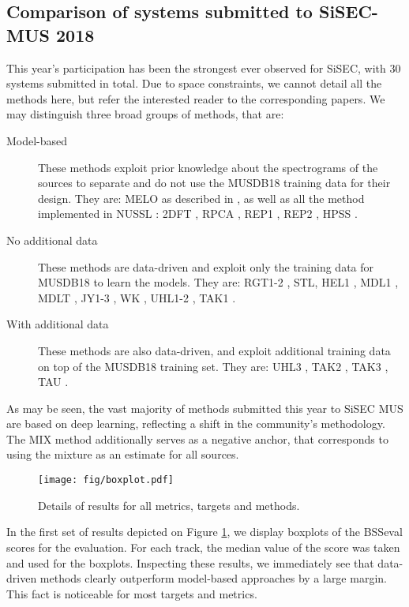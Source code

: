 \documentclass{llncs}
\begin{document}
\subsection{Comparison of systems submitted to SiSEC-MUS 2018}
This year's participation has been the strongest ever observed for SiSEC, with $30$ systems submitted in total. Due to space constraints, we cannot detail all the methods here, but refer the interested reader to the corresponding papers. We may distinguish three broad groups of methods, that are:
\begin{description}
  \item[Model-based] These methods exploit prior knowledge about the spectrograms of the sources to separate and do not use the MUSDB18 training data for their design. They are: MELO as described in \cite{MELO}, as well as all the method implemented in NUSSL \cite{NUSSL}: 2DFT \cite{2DFT}, RPCA \cite{RPCA}, REP1 \cite{REP1}, REP2 \cite{REP2}, HPSS \cite{HPSS}.
  \item[No additional data] These methods are data-driven and exploit only the
  training data for MUSDB18 to learn the models. They are: RGT1-2 \cite{RGT1}, STL, HEL1 \cite{HEL1}, MDL1 \cite{MDL1}, MDLT \cite{MDLT}, JY1-3 \cite{JY1}, WK \cite{WK}, UHL1-2 \cite{UHL}, TAK1 \cite{TAK12}.
  \item[With additional data] These methods are also data-driven, and exploit additional training data on top of the MUSDB18 training set. They are: UHL3 \cite{UHL}, TAK2 \cite{TAK12}, TAK3 \cite{TAK3}, TAU \cite{TAK3,UHL}.
\end{description}

As may be seen, the vast majority of methods submitted this year to SiSEC MUS are based on deep learning, reflecting a shift in the community's methodology. The MIX method additionally serves as a negative anchor, that corresponds to using the mixture as an estimate for all sources.
\begin{figure}
  \begin{center}
     \texttt{[image: fig/boxplot.pdf]}
     \vspace{-0.5cm}
  \end{center}
  \caption{Details of results for all metrics, targets and methods.}
  \label{fig:boxplots_bsseval}
\end{figure}

In the first set of results depicted on Figure \ref{fig:boxplots_bsseval}, we display boxplots of the BSSeval scores for the evaluation. For each track, the median value of the score was taken and used for the boxplots. Inspecting these results, we immediately see that data-driven methods clearly outperform model-based approaches by a large margin. This fact is noticeable for most targets and metrics.
\end{document}
